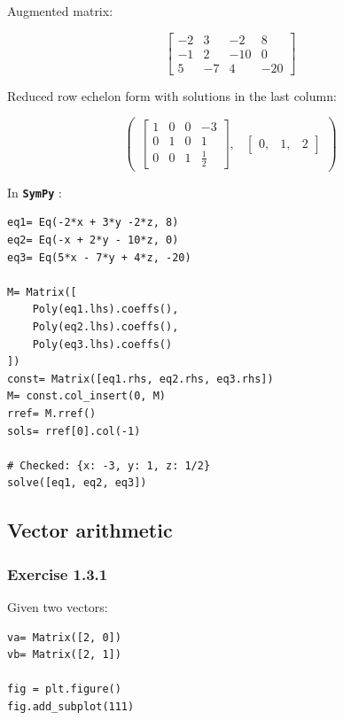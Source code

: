 \documentclass[a4paper]{article}
\newcommand{\sympy}{\textbf{\texttt{\textcolor{OliveGreen}{SymPy}} }}
\begin{document}
Augmented matrix:

\begin{equation}
\left[\begin{matrix}-2 & 3 & -2 & 8\\-1 & 2 & -10 & 0\\5 & -7 & 4 & -20\end{matrix}\right]
\end{equation}

Reduced row echelon form with solutions in the last column:

\begin{equation}
\begin{pmatrix}\left[\begin{matrix}1 & 0 & 0 & -3 \\
                                   0 & 1 & 0 & 1 \\
                                   0 & 0 & 1 &
\frac{1}{2}\end{matrix}\right], & \begin{bmatrix}0, & 1, & 2\end{bmatrix}\end{pmatrix}
\end{equation}

In \sympy:

\begin{verbatim}
eq1= Eq(-2*x + 3*y -2*z, 8)
eq2= Eq(-x + 2*y - 10*z, 0)
eq3= Eq(5*x - 7*y + 4*z, -20)

M= Matrix([
    Poly(eq1.lhs).coeffs(),
    Poly(eq2.lhs).coeffs(),
    Poly(eq3.lhs).coeffs()
])
const= Matrix([eq1.rhs, eq2.rhs, eq3.rhs])
M= const.col_insert(0, M)
rref= M.rref()
sols= rref[0].col(-1)

# Checked: {x: -3, y: 1, z: 1/2}
solve([eq1, eq2, eq3])
\end{verbatim}

\subsection{Vector arithmetic}

\subsubsection{Exercise 1.3.1}

Given two vectors:

\begin{verbatim}
va= Matrix([2, 0])
vb= Matrix([2, 1])

fig = plt.figure()
fig.add_subplot(111)

\end{verbatim}
\end{document}
